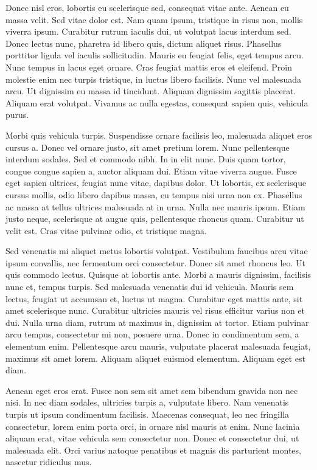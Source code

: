 Donec nisl eros, lobortis eu scelerisque sed, consequat vitae ante. Aenean eu massa velit. Sed vitae dolor est. Nam quam ipsum, tristique in risus non, mollis viverra ipsum. Curabitur rutrum iaculis dui, ut volutpat lacus interdum sed. Donec lectus nunc, pharetra id libero quis, dictum aliquet risus. Phasellus porttitor ligula vel iaculis sollicitudin. Mauris eu feugiat felis, eget tempus arcu. Nunc tempus in lacus eget ornare. Cras feugiat mattis eros et eleifend. Proin molestie enim nec turpis tristique, in luctus libero facilisis. Nunc vel malesuada arcu. Ut dignissim eu massa id tincidunt. Aliquam dignissim sagittis placerat. Aliquam erat volutpat. Vivamus ac nulla egestas, consequat sapien quis, vehicula purus.

Morbi quis vehicula turpis. Suspendisse ornare facilisis leo, malesuada aliquet eros cursus a. Donec vel ornare justo, sit amet pretium lorem. Nunc pellentesque interdum sodales. Sed et commodo nibh. In in elit nunc. Duis quam tortor, congue congue sapien a, auctor aliquam dui. Etiam vitae viverra augue. Fusce eget sapien ultrices, feugiat nunc vitae, dapibus dolor. Ut lobortis, ex scelerisque cursus mollis, odio libero dapibus massa, eu tempus nisi urna non ex. Phasellus ac massa at tellus ultrices malesuada at in urna. Nulla nec mauris ipsum. Etiam justo neque, scelerisque at augue quis, pellentesque rhoncus quam. Curabitur ut velit est. Cras vitae pulvinar odio, et tristique magna.

Sed venenatis mi aliquet metus lobortis volutpat. Vestibulum faucibus arcu vitae ipsum convallis, nec fermentum orci consectetur. Donec sit amet rhoncus leo. Ut quis commodo lectus. Quisque at lobortis ante. Morbi a mauris dignissim, facilisis nunc et, tempus turpis. Sed malesuada venenatis dui id vehicula. Mauris sem lectus, feugiat ut accumsan et, luctus ut magna. Curabitur eget mattis ante, sit amet scelerisque nunc. Curabitur ultricies mauris vel risus efficitur varius non et dui. Nulla urna diam, rutrum at maximus in, dignissim at tortor. Etiam pulvinar arcu tempus, consectetur mi non, posuere urna. Donec in condimentum sem, a elementum enim. Pellentesque arcu mauris, vulputate placerat malesuada feugiat, maximus sit amet lorem. Aliquam aliquet euismod elementum. Aliquam eget est diam.

Aenean eget eros erat. Fusce non sem sit amet sem bibendum gravida non nec nisi. In nec diam sodales, ultricies turpis a, vulputate libero. Nam venenatis turpis ut ipsum condimentum facilisis. Maecenas consequat, leo nec fringilla consectetur, lorem enim porta orci, in ornare nisl mauris at enim. Nunc lacinia aliquam erat, vitae vehicula sem consectetur non. Donec et consectetur dui, ut malesuada elit. Orci varius natoque penatibus et magnis dis parturient montes, nascetur ridiculus mus.